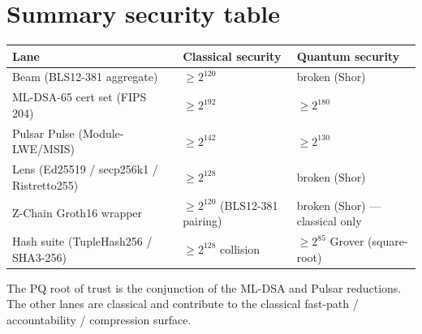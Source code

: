 \documentclass[11pt,a4paper]{article}
\begin{document}
\section{Summary security table}

\begin{tabular}{@{}lll@{}}
  \toprule
  \textbf{Lane} & \textbf{Classical security} & \textbf{Quantum security} \\
  \midrule
  Beam (BLS12-381 aggregate) & $\geq 2^{120}$ & broken (Shor) \\
  ML-DSA-65 cert set (FIPS 204) & $\geq 2^{192}$ & $\geq 2^{180}$ \\
  Pulsar Pulse (Module-LWE/MSIS) & $\geq 2^{142}$ & $\geq 2^{130}$ \\
  Lens (Ed25519 / secp256k1 / Ristretto255) & $\geq 2^{128}$ & broken (Shor) \\
  Z-Chain Groth16 wrapper & $\geq 2^{120}$ (BLS12-381 pairing) & broken (Shor) --- classical only \\
  Hash suite (TupleHash256 / SHA3-256) & $\geq 2^{128}$ collision & $\geq 2^{85}$ Grover (square-root) \\
  \bottomrule
\end{tabular}

The PQ root of trust is the conjunction of the ML-DSA and Pulsar reductions. The other lanes are classical and contribute to the classical fast-path / accountability / compression surface.



\end{document}

